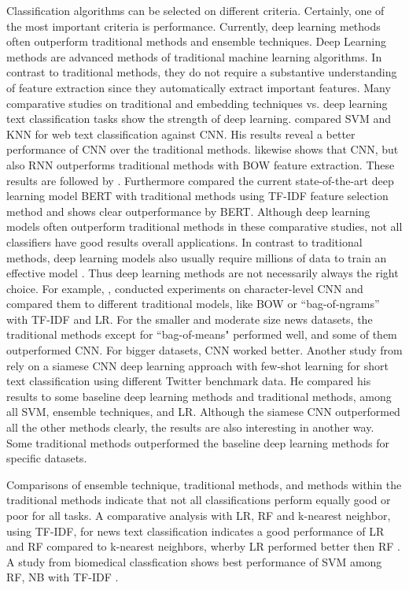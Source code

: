 \documentclass[12pt, a4paper, titlepage]{article}
\begin{document}
Classification algorithms can be selected on different criteria. Certainly, one of the most important criteria is performance. Currently, deep learning methods often outperform traditional methods and ensemble techniques. Deep Learning methods are advanced methods of traditional machine learning algorithms. In contrast to traditional methods, they do not require a substantive understanding of feature extraction since they automatically extract important features. Many comparative studies on traditional and embedding techniques vs. deep learning text classification tasks show the strength of deep learning. \citet{wang2017} compared \ac{SVM} and \ac{KNN} for web text classification against \ac{CNN}. His results reveal a better performance of \ac{CNN} over the traditional methods. \citet{hassan2017} likewise shows that \ac{CNN}, but also \ac{RNN} outperforms traditional methods with \ac{BOW} feature extraction. These results are followed by \citet{kamath2018}. Furthermore \citet{gonzalez2020} compared the current state-of-the-art deep learning model \ac{BERT} with traditional methods using \ac{TF-IDF} feature selection method and shows clear outperformance by \ac{BERT}. Although deep learning models often outperform traditional methods in these comparative studies, not all classifiers have good results overall applications. In contrast to traditional methods, deep learning models also usually require millions of data to train an effective model \citep{chauhan2018}. Thus deep learning methods are not necessarily always the right choice. For example, \citet{zhang2015}, conducted experiments on character-level \ac{CNN} and compared them to different traditional models, like \ac{BOW} or ``bag-of-ngrams'' with \ac{TF-IDF} and \ac{LR}. For the smaller and moderate size news datasets, the traditional methods except for ``bag-of-means" performed well, and some of them outperformed \ac{CNN}. For bigger datasets, \ac{CNN} worked better. Another study from \citet{yan2018} rely on a siamese \ac{CNN} deep learning approach with few-shot learning for short text classification using different Twitter benchmark data. He compared his results to some baseline deep learning methods and traditional methods, among all \ac{SVM}, ensemble techniques, and \ac{LR}. Although the siamese \ac{CNN} outperformed all the other methods clearly, the results are also interesting in another way. Some traditional methods outperformed the baseline deep learning methods for specific datasets.  

Comparisons of ensemble technique, traditional methods, and methods within the traditional methods indicate that not all classifications perform equally good or poor for all tasks. A comparative analysis with \ac{LR}, \ac{RF} and k-nearest neighbor, using \ac{TF-IDF}, for news text classification indicates a good performance of \ac{LR} and \ac{RF} compared to k-nearest neighbors, wherby \ac{LR} performed better then \ac{RF} \citep{shah2020}. A study from biomedical classfication shows best performance of \ac{SVM} among \ac{RF}, \ac{NB} with \ac{TF-IDF} \citep{danso2014}. 
\end{document}
